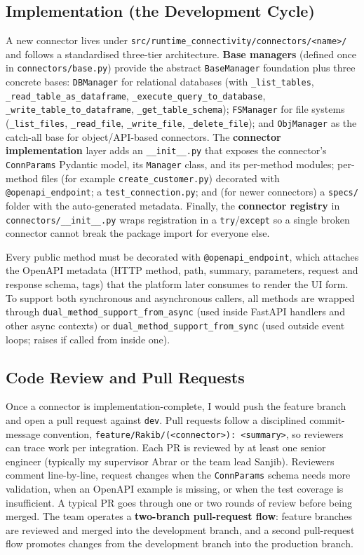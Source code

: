 \subsection{Implementation (the Development Cycle)}
A new connector lives under
\texttt{src/runtime\_connectivity/connectors/<name>/} and follows a
standardised three-tier architecture. \textbf{Base managers}
(defined once in \texttt{connectors/base.py}) provide the abstract
\texttt{BaseManager} foundation plus three concrete bases:
\texttt{DBManager} for relational databases (with
\texttt{\_list\_tables}, \texttt{\_read\_table\_as\_dataframe},
\texttt{\_execute\_query\_to\_database},
\texttt{\_write\_table\_to\_dataframe},
\texttt{\_get\_table\_schema}); \texttt{FSManager} for file systems
(\texttt{\_list\_files}, \texttt{\_read\_file},
\texttt{\_write\_file}, \texttt{\_delete\_file}); and
\texttt{ObjManager} as the catch-all base for object/API-based
connectors. The \textbf{connector implementation} layer adds an
\texttt{\_\_init\_\_.py} that exposes the connector's
\texttt{ConnParams} Pydantic model, its \texttt{Manager} class, and
its per-method modules; per-method files (for example
\texttt{create\_customer.py}) decorated with
\texttt{@openapi\_endpoint}; a \texttt{test\_connection.py}; and
(for newer connectors) a \texttt{specs/} folder with the
auto-generated metadata. Finally, the \textbf{connector registry}
in \texttt{connectors/\_\_init\_\_.py} wraps registration in a
\texttt{try}/\texttt{except} so a single broken connector cannot
break the package import for everyone else.

Every public method must be decorated with
\texttt{@openapi\_endpoint}, which attaches the OpenAPI metadata
(HTTP method, path, summary, parameters, request and response
schema, tags) that the platform later consumes to render the UI
form. To support both synchronous and asynchronous callers, all
methods are wrapped through
\texttt{dual\_method\_support\_from\_async} (used inside FastAPI
handlers and other async contexts) or
\texttt{dual\_method\_support\_from\_sync} (used outside event loops;
raises if called from inside one).

\subsection{Code Review and Pull Requests}
Once a connector is implementation-complete, I would push the feature
branch and open a pull request against \texttt{dev}. Pull requests
follow a disciplined commit-message convention,
\texttt{feature/Rakib/(<connector>): <summary>}, so reviewers can
trace work per integration. Each PR is reviewed by at least one
senior engineer (typically my supervisor Abrar or the team lead
Sanjib). Reviewers comment line-by-line, request changes when the
\texttt{ConnParams} schema needs more validation, when an OpenAPI
example is missing, or when the test coverage is insufficient. A
typical PR goes through one or two rounds of review before being
merged. The team operates a \textbf{two-branch pull-request flow}:
feature branches are reviewed and merged into the development
branch, and a second pull-request flow promotes changes from the
development branch into the production branch.

